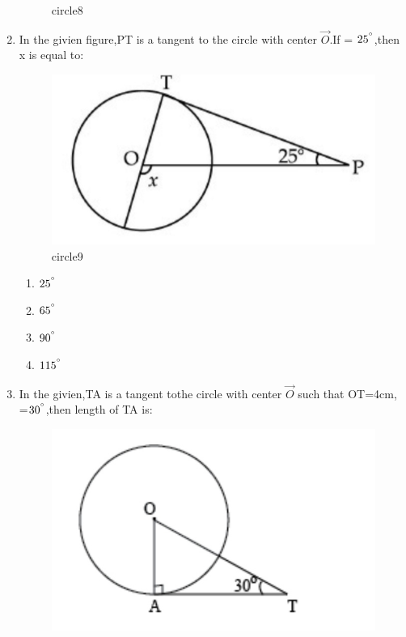 \documentclass[10pt,a4paper]{article}
\begin{document}
\begin{enumerate}
\begin{figure}[h!]
                        \caption{circle8}  
                        \label{fig=pic}
		\end{figure}
	\item In the givien figure,PT is a tangent to the circle with center $\vec{O}$.If =
		$25^{\degree}$,then x is equal to:
		\begin{figure}[h!]
			\centering
			\includegraphics[scale=0.32]{fig9.jpg}
			\caption{circle9}
			\label{fig=pic}
		\end{figure}
		\begin{enumerate}
			\item $25^{\degree}$
			\item $65^{\degree}$
			\item $90^{\degree}$
			\item $115^{\degree}$
		\end{enumerate}
	\item In the givien,TA is a tangent tothe circle with center $\vec{O}$ such that OT=4cm, =$30^
		{\degree}$,then length of TA is:
		\begin{figure}[!h]
			\centering
			\includegraphics[scale=0.3]{fig10.jpg}

\end{figure}
\end{enumerate}
\end{document}
